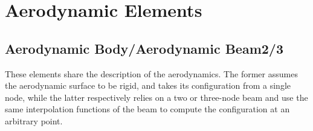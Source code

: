 %
%
%
%
%
% 
%
%

\section{Aerodynamic Elements}
\label{sec:EL:AERO}


\subsection{Aerodynamic Body/Aerodynamic Beam2/3}
\label{sec:EL:AERO:BODY-BEAM23}
These elements share the description of the aerodynamics.
The former assumes the aerodynamic surface to be rigid,
and takes its configuration from a single node, while the latter
respectively relies on a two or three-node beam
and use the same interpolation functions of the beam to compute
the configuration at an arbitrary point.

